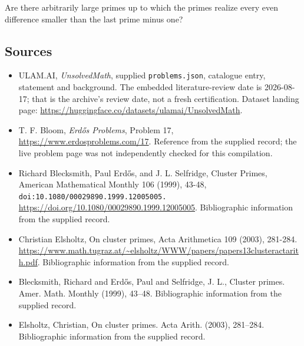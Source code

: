 \documentclass[11pt,a4paper]{article}
\begin{document}
Are there arbitrarily large primes up to which the primes realize every even difference smaller than the last prime minus one?

\subsection{Sources}

{\small

\begin{itemize}

\item[\hypertarget{source:statement:1}{S1}] ULAM.AI, \emph{UnsolvedMath}, supplied \texttt{problems.json}, catalogue entry, statement and background. The embedded literature-review date is 2026-08-17; that is the archive’s review date, not a fresh certification. Dataset landing page: \url{https://huggingface.co/datasets/ulamai/UnsolvedMath}.

\item[\hypertarget{source:statement:2}{S2}] T. F. Bloom, \emph{Erdős Problems}, Problem 17, \url{https://www.erdosproblems.com/17}. Reference from the supplied record; the live problem page was not independently checked for this compilation.

\item[\hypertarget{source:statement:3}{S3}] Richard Blecksmith, Paul Erdős, and J. L. Selfridge, Cluster Primes, American Mathematical Monthly 106 (1999), 43-48, \nolinkurl{doi:10.1080/00029890.1999.12005005.} \url{https://doi.org/10.1080/00029890.1999.12005005}. Bibliographic information from the supplied record.

\item[\hypertarget{source:statement:4}{S4}] Christian Elsholtz, On cluster primes, Acta Arithmetica 109 (2003), 281-284. \url{https://www.math.tugraz.at/~elsholtz/WWW/papers/papers13clusteractarith.pdf}. Bibliographic information from the supplied record.

\item[\hypertarget{source:statement:5}{S5}] Blecksmith, Richard and Erd\H{o}s, Paul and Selfridge, J. L., Cluster primes. Amer. Math. Monthly (1999), 43--48. Bibliographic information from the supplied record.

\item[\hypertarget{source:statement:6}{S6}] Elsholtz, Christian, On cluster primes. Acta Arith. (2003), 281--284. Bibliographic information from the supplied record.

\end{itemize}

}

\label{end:statement}
\end{document}
